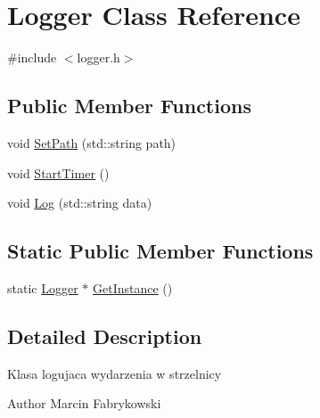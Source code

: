 \hypertarget{classLogger}{
\section{Logger Class Reference}
\label{classLogger}
}


{\ttfamily \#include $<$logger.h$>$}

\subsection*{Public Member Functions}
\begin{DoxyCompactItemize}
\item 
void \hyperlink{classLogger_a82870c41423ead8d99e43ad7f65801c9}{SetPath} (std::string path)
\item 
void \hyperlink{classLogger_a3d5ca95baed18bb70cac5810dd75b078}{StartTimer} ()
\item 
void \hyperlink{classLogger_a1072e97828310d0ea96359b1f2860344}{Log} (std::string data)
\end{DoxyCompactItemize}
\subsection*{Static Public Member Functions}
\begin{DoxyCompactItemize}
\item 
static \hyperlink{classLogger}{Logger} $\ast$ \hyperlink{classLogger_ab01142bf10138e73356980ad146e95ba}{GetInstance} ()
\end{DoxyCompactItemize}


\subsection{Detailed Description}
Klasa logujaca wydarzenia w strzelnicy \begin{DoxyAuthor}{Author}
Marcin Fabrykowski 
\end{DoxyAuthor}


